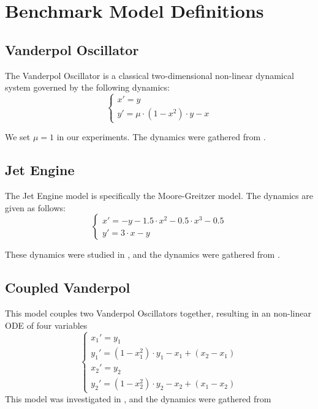\appendix

\chapter{Benchmark Model Definitions}
\label{app:benchmark}

\section{Vanderpol Oscillator}
\label{sec:vdp}
The Vanderpol Oscillator is a classical two-dimensional non-linear dynamical system governed by the following dynamics:
\begin{equation}
  \begin{cases}
  x' = y \\
  y' = \mu \cdot(1 - x^2)\cdot y - x
  \end{cases}
 \end{equation}

 We set $\mu = 1$ in our experiments. The dynamics were gathered from \cite{aachen}.


\section{Jet Engine}
The Jet Engine model is specifically the Moore-Greitzer model. The dynamics are given as follows:
\begin{equation}
  \begin{cases}
  x' = -y - 1.5\cdot x^2 - 0.5\cdot x^3 - 0.5 \\
  y' = 3\cdot x - y
  \end{cases}
 \end{equation}

\noindent These dynamics were studied in \cite{aylward2008stability}, and the dynamics were gathered from \cite{aachen}.

\section{Coupled Vanderpol}
This model couples two Vanderpol Oscillators together, resulting in an non-linear ODE of four variables
\begin{equation}
  \begin{cases}
  x_1' = y_1\\
  y_1' = (1-x_1^2)\cdot y_1 - x_1 + (x_2 - x_1) \\
  x_2 ' = y_2 \\
  y_2' = (1-x_2^2)\cdot y_2 - x_2 + (x_1 - x_2)
  \end{cases}
 \end{equation}
\noindent This model was investigated in \cite{rand1980bifurcation}, and the dynamics were gathered from \cite{aachen}


